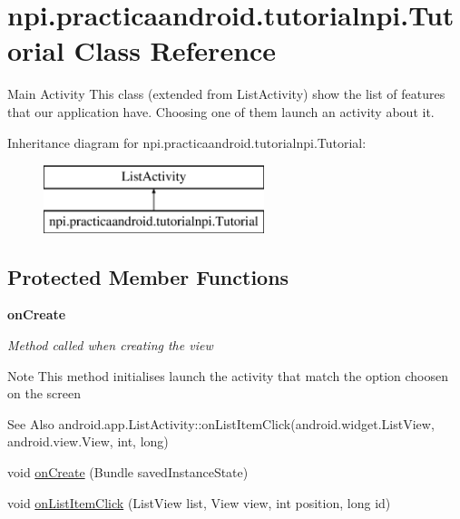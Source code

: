 \hypertarget{classnpi_1_1practicaandroid_1_1tutorialnpi_1_1_tutorial}{\section{npi.\-practicaandroid.\-tutorialnpi.\-Tutorial Class Reference}
\label{classnpi_1_1practicaandroid_1_1tutorialnpi_1_1_tutorial}
}


Main Activity This class (extended from List\-Activity) show the list of features that our application have. Choosing one of them launch an activity about it.  


Inheritance diagram for npi.\-practicaandroid.\-tutorialnpi.\-Tutorial\-:\begin{figure}[H]
\begin{center}
\leavevmode
\includegraphics[height=2.000000cm]{classnpi_1_1practicaandroid_1_1tutorialnpi_1_1_tutorial}
\end{center}
\end{figure}
\subsection*{Protected Member Functions}
\begin{Indent}{\bf on\-Create}\par
{\em Method called when creating the view

\begin{DoxyNote}{Note}
This method initialises launch the activity that match the option choosen on the screen
\end{DoxyNote}
\begin{DoxySeeAlso}{See Also}
android.\-app.\-List\-Activity\-::on\-List\-Item\-Click(android.\-widget.\-List\-View, android.\-view.\-View, int, long) 
\end{DoxySeeAlso}
}\begin{DoxyCompactItemize}
\item 
void \hyperlink{classnpi_1_1practicaandroid_1_1tutorialnpi_1_1_tutorial_ac8e775d4ab432f864e43b23c5ccd3142}{on\-Create} (Bundle saved\-Instance\-State)
\item 
void \hyperlink{classnpi_1_1practicaandroid_1_1tutorialnpi_1_1_tutorial_a0ab47398e86319bc399f400f66243c0e}{on\-List\-Item\-Click} (List\-View list, View view, int position, long id)
\end{DoxyCompactItemize}
\end{Indent}


